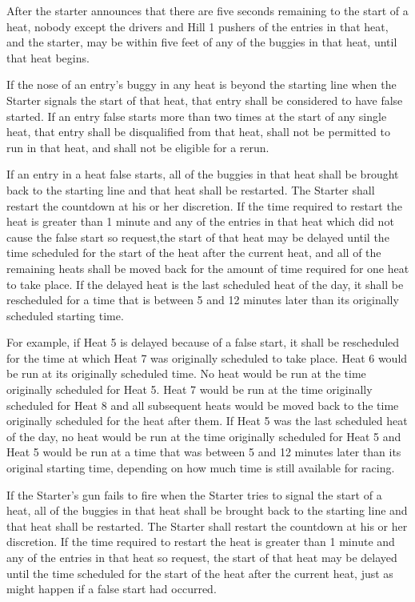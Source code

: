 	After the starter announces that there are five seconds remaining to the start
	of a heat, nobody except the drivers and Hill 1 pushers of the entries in that
	heat, and the starter, may be within five feet of any of the buggies in that
	heat, until that heat begins.

	If the nose of an entry's buggy in any heat is beyond the starting line when
	the Starter signals the start of that heat, that entry shall be considered to
	have false started. If an entry false starts more than two times at the start
	of any single heat, that entry shall be disqualified from that heat, shall not
	be permitted to run in that heat, and shall not be eligible for a rerun.

	If an entry in a heat false starts, all of the buggies in that heat shall be
	brought back to the starting line and that heat shall be restarted. The Starter
	shall restart the countdown at his or her discretion. If the time required to
	restart the heat is greater than 1 minute and any of the entries in that heat
	which did not cause the false start so request,the start of that heat may be
	delayed until the time scheduled for the start of the heat after the current
	heat, and all of the remaining heats shall be moved back for the amount of time
	required for one heat to take place. If the delayed heat is the last scheduled
	heat of the day, it shall be rescheduled for a time that is between 5 and 12
	minutes later than its originally scheduled starting time.

	For example, if Heat 5 is delayed because of a false start, it shall be
	rescheduled for the time at which Heat 7 was originally scheduled to take
	place. Heat 6 would be run at its originally scheduled time. No heat would be
	run at the time originally scheduled for Heat 5. Heat 7 would be run at the
	time originally scheduled for Heat 8 and all subsequent heats would be moved
	back to the time originally scheduled for the heat after them. If Heat 5 was
	the last scheduled heat of the day, no heat would be run at the time originally
	scheduled for Heat 5 and Heat 5 would be run at a time that was between 5 and
	12 minutes later than its original starting time, depending on how much time is
	still available for racing.

	If the Starter's gun fails to fire when the Starter tries to signal the start
	of a heat, all of the buggies in that heat shall be brought back to the
	starting line and that heat shall be restarted. The Starter shall restart the
	countdown at his or her discretion. If the time required to restart the heat is
	greater than 1 minute and any of the entries in that heat so request, the start
	of that heat may be delayed until the time scheduled for the start of the heat
	after the current heat, just as might happen if a false start had occurred.

